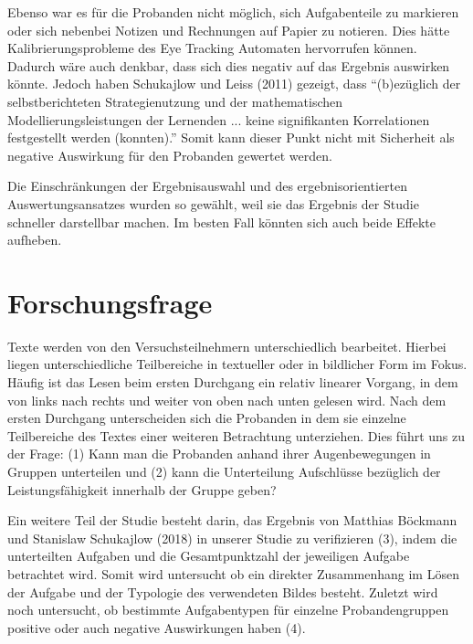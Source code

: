 Ebenso war es für die Probanden nicht möglich, sich Aufgabenteile zu markieren oder sich nebenbei Notizen und Rechnungen auf Papier zu notieren. Dies hätte Kalibrierungsprobleme des Eye Tracking Automaten hervorrufen können. Dadurch wäre auch denkbar, dass sich dies negativ auf das Ergebnis auswirken könnte. Jedoch haben Schukajlow und Leiss (2011) gezeigt, dass ``(b)ezüglich der selbstberichteten Strategienutzung und der mathematischen Modellierungsleistungen der Lernenden ... keine signifikanten Korrelationen festgestellt werden\cite{schukajlow2011selbstberichtete} (konnten).'' Somit kann dieser Punkt nicht mit Sicherheit als negative Auswirkung für den Probanden gewertet werden. 

Die Einschränkungen der Ergebnisauswahl und des ergebnisorientierten Auswertungsansatzes wurden so gewählt, weil sie das Ergebnis der Studie schneller darstellbar machen. Im besten Fall könnten sich auch beide Effekte aufheben.
\section{Forschungsfrage}

Texte werden von den Versuchsteilnehmern unterschiedlich bearbeitet. Hierbei liegen unterschiedliche Teilbereiche in textueller oder in bildlicher Form im Fokus. Häufig ist das Lesen beim ersten Durchgang ein relativ linearer Vorgang, in dem von links nach rechts und weiter von oben nach unten gelesen wird. Nach dem ersten Durchgang unterscheiden sich die Probanden in dem sie einzelne Teilbereiche des Textes einer weiteren Betrachtung unterziehen. Dies führt uns zu der Frage:
(1) Kann man die Probanden anhand ihrer Augenbewegungen in Gruppen unterteilen und (2) kann die Unterteilung Aufschlüsse bezüglich der Leistungsfähigkeit innerhalb der Gruppe geben?

Ein weitere Teil der Studie besteht darin, das Ergebnis von Matthias Böckmann und Stanislaw Schukajlow (2018)\cite{bockmannvalue} in unserer Studie zu verifizieren (3), indem die unterteilten Aufgaben und die Gesamtpunktzahl der jeweiligen Aufgabe betrachtet wird. Somit wird untersucht ob ein direkter Zusammenhang im Lösen der Aufgabe und der Typologie des verwendeten Bildes besteht. Zuletzt wird noch untersucht, ob bestimmte Aufgabentypen für einzelne Probandengruppen positive oder auch negative Auswirkungen haben (4).